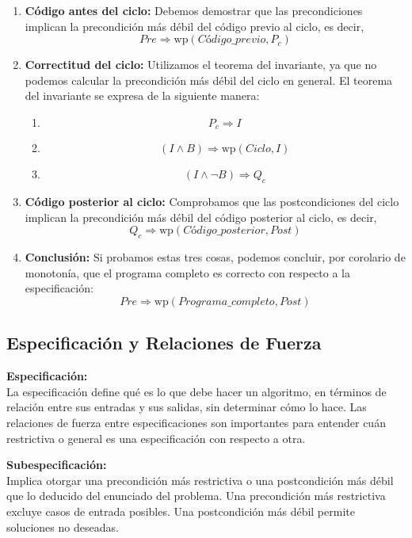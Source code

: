 \documentclass[9pt]{extarticle}  %
\begin{document}
\begin{enumerate}
    \item \textbf{Código antes del ciclo:} Debemos demostrar que las precondiciones implican la precondición más débil del código previo al ciclo, es decir,
    \[ Pre \Rightarrow \text{wp}(Código\_previo, P_c) \]
    
    \item \textbf{Correctitud del ciclo:} Utilizamos el teorema del invariante, ya que no podemos calcular la precondición más débil del ciclo en general. El teorema del invariante se expresa de la siguiente manera:
    
    \begin{enumerate}
        \item \[ P_c \Rightarrow I \]
        \item \[ (I \land B) \Rightarrow \text{wp}(Ciclo, I) \]
        \item \[ (I \land \neg B) \Rightarrow Q_c \]
    \end{enumerate}

    \item \textbf{Código posterior al ciclo:} Comprobamos que las postcondiciones del ciclo implican la precondición más débil del código posterior al ciclo, es decir,
    \[ Q_c \Rightarrow \text{wp}(Código\_posterior, Post) \]

    \item \textbf{Conclusión:} Si probamos estas tres cosas, podemos concluir, por corolario de monotonía, que el programa completo es correcto con respecto a la especificación:
    \[ Pre \Rightarrow \text{wp}(Programa\_completo, Post) \]
\end{enumerate}
\vspace{-0.6cm}

\subsection*{\tiny{Especificación y Relaciones de Fuerza}}

\noindent\textbf{Especificación:} \\
La especificación define qué es lo que debe hacer un algoritmo, en términos de relación entre sus entradas y sus salidas, sin determinar cómo lo hace. Las relaciones de fuerza entre especificaciones son importantes para entender cuán restrictiva o general es una especificación con respecto a otra.

\noindent\textbf{Subespecificación:} \\
Implica otorgar una precondición más restrictiva o una postcondición más débil que lo deducido del enunciado del problema. Una precondición más restrictiva excluye casos de entrada posibles. Una postcondición más débil permite soluciones no deseadas.
\end{document}
